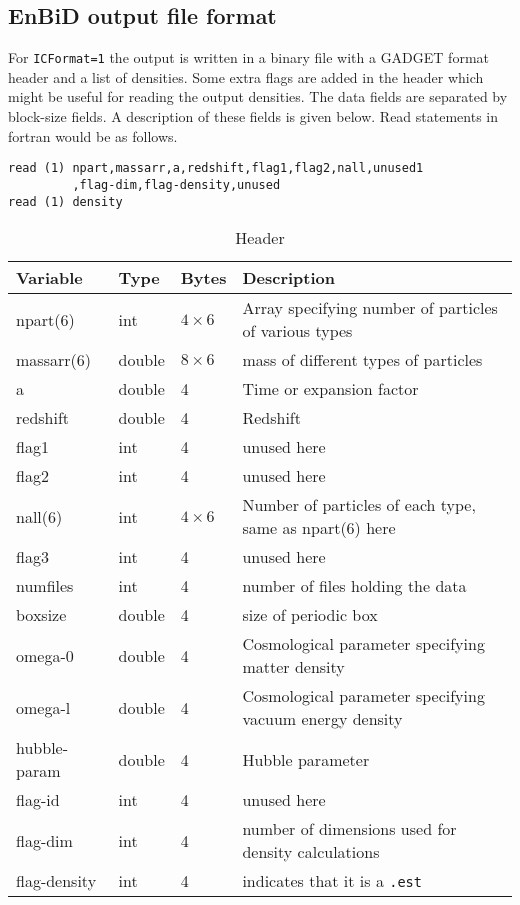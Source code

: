 \documentclass{article}
\begin{document}
\subsection{EnBiD output file format}
For \verb$ICFormat=1$ the output is written in 
a binary file with a GADGET format header and a list of densities. 
Some extra flags are added in the header which might be useful for
reading the output densities. The data fields are
separated  by block-size fields. A description of these fields 
is given below. Read statements in fortran 
would be as follows.
\begin{verbatim}
read (1) npart,massarr,a,redshift,flag1,flag2,nall,unused1
         ,flag-dim,flag-density,unused
read (1) density
\end{verbatim}
\newpage
\begin{table}[here]
  \caption{Header}
  \begin{tabular}{|p{1.5cm}|p{1.5cm}|p{1.5cm}|p{6cm}|}
\hline
\hline
  Variable     &  Type   &   Bytes & Description\\
\hline
npart(6) & int & $4\times6$ & Array specifying number of particles of various types\\
massarr(6) & double & $8\times6$ & mass of different types of particles\\
a & double & 4 & Time or expansion factor\\
redshift & double & 4 & Redshift\\
flag1 & int & 4 & unused here \\
flag2 & int & 4 & unused here \\
nall(6) & int & $4\times6$ & Number of particles of each type, same as npart(6) here\\
flag3 & int & 4 & unused here \\
numfiles & int & 4 & number of files holding the data \\
boxsize & double & 4 & size of periodic box\\
omega-0 & double & 4 & Cosmological parameter specifying matter density \\
omega-l & double & 4 &  Cosmological parameter specifying vacuum energy density\\
hubble-param & double & 4 & Hubble parameter \\
\hline
\textsf{flag-id} & int & 4 & unused here\\
\textsf{flag-dim} & int & 4 & number of dimensions used for density calculations \\
\textsf{flag-density} & int & 4 &  indicates that it is a \verb$.est$

\end{tabular}
\end{table}
\end{document}
